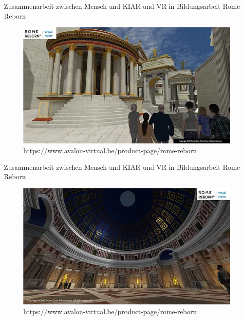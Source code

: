 \documentclass[169,9pt]{beamer}
\begin{document}
\begin{frame}{Zusammenarbeit zwischen Mensch und KI}{AR und VR in Bildungsarbeit}
Rome Reborn
\begin{figure}[h]
    \centering
    \includegraphics[width=1.0\textwidth]{Romereborn2.png}
    \caption{\smaller \smaller https://www.avalon-virtual.be/product-page/rome-reborn}
    \label{fig:my_label}
\end{figure}
\end{frame}

\begin{frame}{Zusammenarbeit zwischen Mensch und KI}{AR und VR in Bildungsarbeit}
Rome Reborn
\begin{figure}[h]
    \centering
    \includegraphics[width=1.0\textwidth]{RomeReborn3.png}
    \caption{\smaller \smaller https://www.avalon-virtual.be/product-page/rome-reborn}
    \label{fig:my_label}
\end{figure}
\end{frame}
\end{document}
